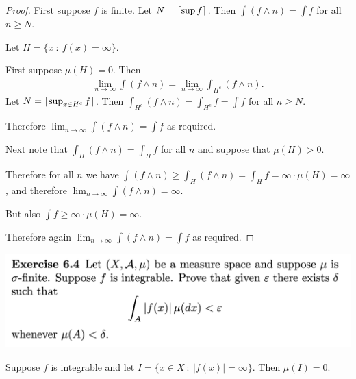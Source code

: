 \begin{proof}

  First suppose $f$ is finite. Let $N = \lceil\sup f\rceil$. Then $\int (f \land n) = \int f$ for all $n \geq N$.

  Let $H = \{x ~:~ f(x) = \infty\}$.

  First suppose $\mu(H) = 0$. Then
  \begin{align*}
    \lim_{n\to\infty} \int (f \land n) = \lim_{n\to\infty} \int_{H^c} (f \land n).
  \end{align*}
  Let $N = \lceil\sup_{x \in H^c} f\rceil$. Then $\int_{H^c} (f \land n) = \int_{H^c} f = \int f$ for
  all $n \geq N$.

  Therefore $\lim_{n\to\infty} \int (f \land n) = \int f$ as required.

  Next note that $\int_H (f \land n) = \int_H f$ for all $n$ and suppose that $\mu(H) > 0$.

  Therefore for all $n$ we
  have $\int (f \land n) \geq \int_H (f \land n) = \int_H f = \infty \cdot \mu(H) = \infty$, and
  therefore $\lim_{n\to\infty} \int (f \land n) = \infty$.

  But also $\int f \geq \infty \cdot \mu(H) = \infty$.

  Therefore again $\lim_{n\to\infty} \int (f \land n) = \int f$ as required.
\end{proof}

\newpage
\begin{mdframed}
\includegraphics[width=400pt]{img/analysis--berkeley-202a-hw07-610e.png}
\end{mdframed}

\begin{lemma}\label{lemma-integrable-fn-is-infinite-on-a-null-set}
  Suppose $f$ is integrable and let $I = \{x \in X ~:~ |f(x)| = \infty \}$. Then $\mu(I) = 0$.
\end{lemma}

